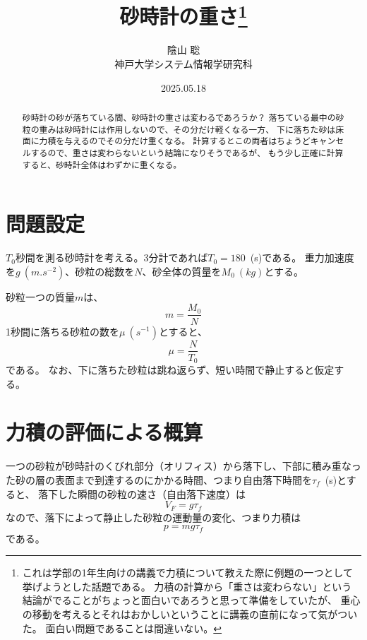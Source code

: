 \documentclass[]{article}
\title{砂時計の重さ\footnote{%
これは学部の1年生向けの講義で力積について教えた際に例題の一つとして挙げようとした話題である。
力積の計算から「重さは変わらない」という結論がでることがちょっと面白いであろうと思って準備をしていたが、
重心の移動を考えるとそれはおかしいということに講義の直前になって気がついた。
面白い問題であることは間違いない。
}}
\author{陰山 聡\\[0.5em] 神戸大学システム情報学研究科}
\date{2025.05.18}
\begin{document}
\maketitle


\begin{abstract}
砂時計の砂が落ちている間、砂時計の重さは変わるであろうか？
落ちている最中の砂粒の重みは砂時計には作用しないので、その分だけ軽くなる一方、
下に落ちた砂は床面に力積を与えるのでその分だけ重くなる。
計算するとこの両者はちょうどキャンセルするので、重さは変わらないという結論になりそうであるが、
もう少し正確に計算すると、砂時計全体はわずかに重くなる。
\end{abstract}


\section{問題設定}
$T_0$秒間を測る砂時計を考える。3分計であれば$T_0=180$~(\si{s})である。
重力加速度を$g~(\si{m.s^{-2}})$、砂粒の総数を$N$、砂全体の質量を$M_0~(\si{kg})$とする。


砂粒一つの質量$m$は、
\begin{equation} \label{250517100232} 
   m = \frac{M_0}{N} 
\end{equation}
1秒間に落ちる砂粒の数を$\mu~(\si{s^{-1}})$とすると、
\begin{equation} \label{250515082817} 
   \mu = \frac{N}{T_0}
\end{equation}
である。
なお、下に落ちた砂粒は跳ね返らず、短い時間で静止すると仮定する。


\section{力積の評価による概算} \label{250517204115}

一つの砂粒が砂時計のくびれ部分（オリフィス）から落下し、下部に積み重なった砂の層の表面まで到達するのにかかる時間、つまり自由落下時間を$\tau_f$~(\si{s})とすると、
落下した瞬間の砂粒の速さ（自由落下速度）は
\begin{equation} \label{250512190520} 
   V_F = g\tau_f
\end{equation}
なので、落下によって静止した砂粒の運動量の変化、つまり力積は
\begin{equation} \label{250512190655} 
   p = mg\tau_f
\end{equation}
である。
\end{document}
